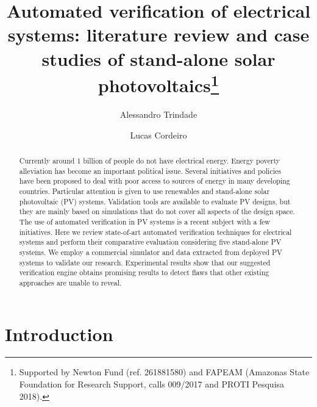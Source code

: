 \documentclass[runningheads]{llncs}
\begin{document}
%
\title{Automated verification of electrical systems: literature review and case studies of stand-alone solar photovoltaics\thanks{Supported by Newton Fund (ref. 261881580) and FAPEAM
(Amazonas State Foundation for Research Support, calls 009/2017 and PROTI Pesquisa 2018).}}
%
%
\author{Alessandro Trindade \and
Lucas Cordeiro}
%
%
\maketitle              %
%
\begin{abstract}
Currently around 1 billion of people do not have electrical energy. Energy poverty alleviation has become an important political issue. Several initiatives and policies have been proposed to deal with poor access to sources of energy in many developing countries. Particular attention is given to use renewables and stand-alone solar photovoltaic (PV) systems. Validation tools are available to evaluate PV designs, but they are mainly based on simulations that do not cover all aspects of the design space. The use of automated verification in PV systems is a recent subject with a few initiatives. Here we review state-of-art automated verification techniques for electrical systems and perform their comparative evaluation considering five stand-alone PV systems. We employ a commercial simulator and data extracted from deployed PV systems to validate our research. Experimental results show that our suggested verification engine obtains promising results to detect flaws that other existing approaches are unable to reveal.

\end{abstract}
%

\section{Introduction}
\end{document}
